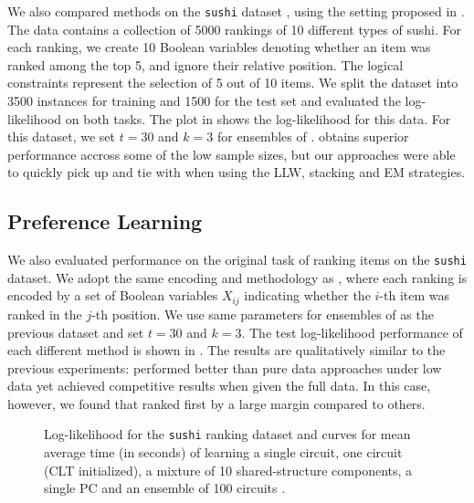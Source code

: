 We also compared methods on the \texttt{sushi} dataset \citep{kamishima03}, using the setting
proposed in \citet{shen17}. The data contains a collection of \num{5000} rankings of \num{10}
different types of sushi. For each ranking, we create \num{10} Boolean variables denoting whether
an item was ranked among the top 5, and ignore their relative position. The logical constraints
represent the selection of \num{5} out of \num{10} items. We split the dataset into \num{3500}
instances for training and \num{1500} for the test set and evaluated the log-likelihood on both
tasks. The plot in  shows the log-likelihood for this data. For this
dataset, we set $t=30$ and $k=3$ for ensembles of . 
obtains superior performance accross some of the low sample sizes, but our approaches were able to
quickly pick up and tie with  when using the LLW, stacking and EM strategies.

\subsection{Preference Learning}

We also evaluated performance on the original task of ranking items on the \texttt{sushi} dataset.
We adopt the same encoding and methodology as \citep{choi15}, where each ranking is encoded by a
set of Boolean variables $X_{ij}$ indicating whether the $i$-th item was ranked in the $j$-th
position. We use same parameters for ensembles of  as the previous dataset and
set $t=30$ and $k=3$. The test log-likelihood performance of each different method is shown in
. The results are qualitatively similar to the previous experiments:
 performed better than pure data approaches under low data yet achieved
competitive results when given the full data. In this case, however, we found that
 ranked first by a large margin compared to others.

\begin{figure}[t]
  \begin{subfigure}{0.495\textwidth}
    \caption{}
    \label{fig:ll-sushi-ranking}
  \end{subfigure}
  \begin{subfigure}{0.495\textwidth}
    \caption{}
    \label{fig:sushi-time}
  \end{subfigure}
  \caption{Log-likelihood for the \texttt{sushi} ranking  dataset and curves for
    mean average time (in seconds) of learning a single  circuit, one
     circuit (CLT initialized), a mixture of 10 shared-structure
     components, a single  PC and an ensemble of 100
     circuits .}
  \label{fig:ll-preference}
\end{figure}


